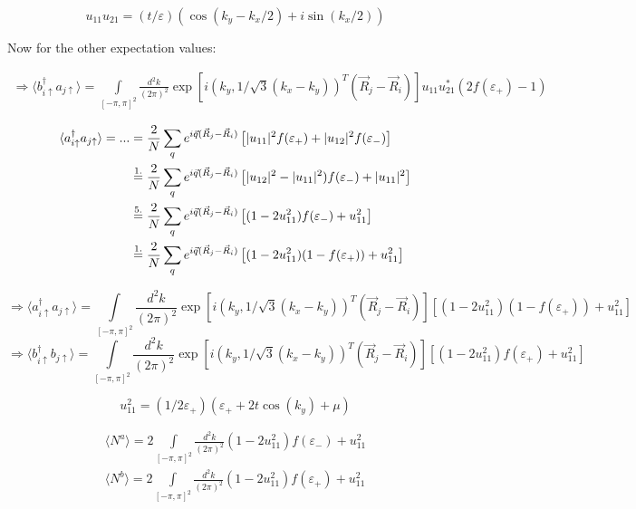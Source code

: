 \documentclass[../../../main.tex]{subfiles}
\begin{document}
\begin{equation}
	u_{11}u_{21} = (t/\varepsilon)(\cos(k_y-k_x/2) + i \sin(k_x/2))
\end{equation}

Now for the other expectation values:

\begin{align}
	\Rightarrow \langle b_{i\uparrow}^\dagger a_{j\uparrow} \rangle = \int\limits_{[-\pi,\pi]^2} \frac{d^2k}{(2\pi)^2} \exp[i\left(k_y, 1/\sqrt{3}(k_x-k_y)\right)^T(\vec{R}_j-\vec{R}_i)]u_{11}u_{21}^*\left(2f(\varepsilon_+) - 1\right)
\end{align}

\begin{align}
	\langle a_{i\uparrow}^\dagger a_{j\uparrow} \rangle = ... &= \frac{2}{N} \sum_q e^{i\vec{q}(\vec{R}_j - \vec{R}_i)} \left[|u_{11}|^2f(\varepsilon_+) + |u_{12}|^2f(\varepsilon_-)\right] \notag \\
	&\overset{1.}{=} \frac{2}{N} \sum_q e^{i\vec{q}(\vec{R}_j - \vec{R}_i)}\left[|u_{12}|^2 - |u_{11}|^2)f(\varepsilon_-) + |u_{11}|^2 \right] \notag \\
	&\overset{5.}{=} \frac{2}{N} \sum_q e^{i\vec{q}(\vec{R}_j - \vec{R}_i)}\left[(1-2u_{11}^2)f(\varepsilon_-) + u_{11}^2\right] \notag \\
	&\overset{1.}{=} \frac{2}{N} \sum_q e^{i\vec{q}(\vec{R}_j - \vec{R}_i)}\left[(1-2u_{11}^2)(1-f(\varepsilon_+)) + u_{11}^2\right]
\end{align}

\begin{equation}
	\Rightarrow\langle a_{i\uparrow}^\dagger a_{j\uparrow} \rangle = \int\limits_{[-\pi,\pi]^2} \frac{d^2k}{(2\pi)^2} \exp[i\left(k_y, 1/\sqrt{3}(k_x-k_y)\right)^T(\vec{R}_j-\vec{R}_i)]\left[(1-2u_{11}^2)(1-f(\varepsilon_+)) + u_{11}^2\right]
\end{equation}
\begin{equation}
	\Rightarrow\langle b_{i\uparrow}^\dagger b_{j\uparrow} \rangle = \int\limits_{[-\pi,\pi]^2} \frac{d^2k}{(2\pi)^2} \exp[i\left(k_y, 1/\sqrt{3}(k_x-k_y)\right)^T(\vec{R}_j-\vec{R}_i)]\left[(1-2u_{11}^2)f(\varepsilon_+) + u_{11}^2\right]
\end{equation}

\begin{equation}
u_{11}^2 = (1/2\varepsilon_+)(\varepsilon_+ + 2t\cos(k_y) + \mu)
\end{equation}

\begin{gather}
	\langle N^a \rangle = 2\int\limits_{[-\pi,\pi]^2} \frac{d^2k}{(2\pi)^2}(1-2u_{11}^2)f(\varepsilon_-) + u_{11}^2 \\
	\langle N^b \rangle = 2\int\limits_{[-\pi,\pi]^2} \frac{d^2k}{(2\pi)^2}(1-2u_{11}^2)f(\varepsilon_+) + u_{11}^2
\end{gather}
\end{document}
